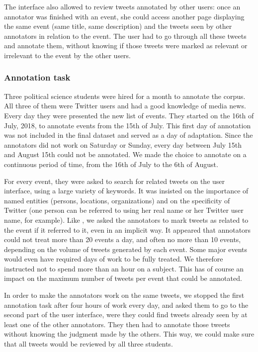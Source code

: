 The interface also allowed to review tweets annotated by other users: once an annotator was finished with an event, she could access another page displaying the same event (same title, same description) and the tweets seen by other annotators in relation to the event. The user had to go through all these tweets and annotate them, without knowing if those tweets were marked as relevant or irrelevant to the event by the other users.

		\subsubsection{Annotation task}
	Three political science students were hired for a month to annotate the corpus. All three of them were Twitter users and had a good knowledge of media news. Every day they were presented the new list of events. They started on the 16th of July, 2018, to annotate events from the 15th of July. This first day of annotation was not included in the final dataset and served as a day of adaptation. Since the annotators did not work on Saturday or Sunday, every day between July 15th and August 15th could not be annotated. We made the choice to annotate on a continuous period of time, from the 16th of July to the 6th of August.


For every event, they were asked to search for related tweets on the user interface, using a large variety of keywords. It was insisted on the importance of named entities (persons, locations, organizations) and on the specificity of Twitter (one person can be referred to using her real name or her Twitter user name, for example). Like \citet{mcminn_building_2013}, we asked the annotators to mark tweets as related to the event if it referred to it, even in an implicit way. It appeared that annotators could not treat more than 20 events a day, and often no more than 10 events, depending on the volume of tweets generated by each event. Some major events would even have required days of work to be fully treated. We therefore instructed not to spend more than an hour on a subject. This has of course an impact on the maximum number of tweets per event that could be annotated. 


In order to make the annotators work on the same tweets, we stopped the first annotation task after four hours of work every day, and asked them to go to the second part of the user interface, were they could find tweets already seen by at least one of the other annotators. They then had to annotate those tweets without knowing the judgment made by the others. This way, we could make sure that all tweets would be reviewed by all three students.
	
